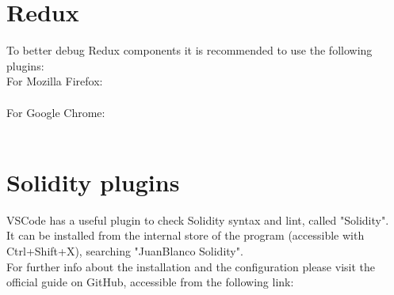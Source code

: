 \documentclass[ManualeSviluppatore]{subfiles}
\begin{document}
\section{Redux}
To better debug Redux components it is recommended to use the following plugins: \\
For Mozilla Firefox: \\
 \\
For Google Chrome: \\
 \\

\section{Solidity plugins}
VSCode has a useful plugin to check Solidity syntax and lint, called "Solidity".\\
It can be installed from the internal store of the program (accessible with Ctrl+Shift+X), searching "JuanBlanco Solidity". \\
For further info about the installation and the configuration please visit the official guide on GitHub, accessible from the following link:
\end{document}
